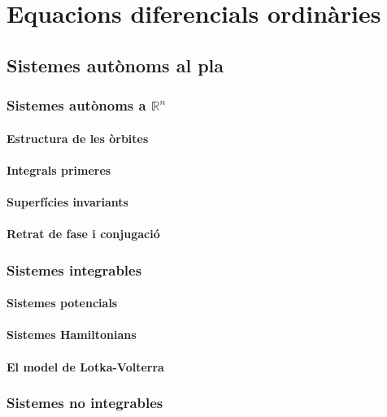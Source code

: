 \documentclass[../Apunts.tex]{subfiles}
\begin{document}
\part{Equacions diferencials ordinàries }
\chapter{Sistemes autònoms al pla}
	\section{Sistemes autònoms a \ensuremath{\mathbb{R}^{n}}}
	\subsection{Estructura de les òrbites}
	\subsection{Integrals primeres}
	\subsection{Superfícies invariants}
	\subsection{Retrat de fase i conjugació}
	\section{Sistemes integrables}
	\subsection{Sistemes potencials}
	\subsection{Sistemes Hamiltonians}
	\subsection{El model de Lotka-Volterra}
	\section{Sistemes no integrables}
\end{document}
